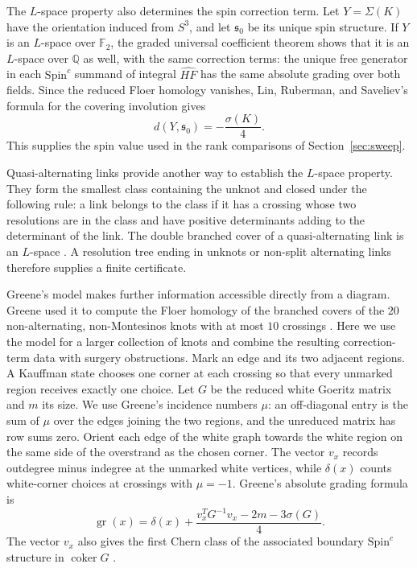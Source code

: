 \documentclass[12pt, oneside]{amsart}
\newcommand{\bbq}{{\mathbb Q}}
\newcommand{\dbc}{\Sigma}
\begin{document}
The $L$-space property also determines the spin correction term. Let
$Y=\dbc(K)$ have the orientation induced from $S^3$, and let $\mathfrak s_0$
be its unique spin structure. If $Y$ is an $L$-space over $\mathbb F_2$,
the graded universal coefficient theorem shows that it is an $L$-space over
$\bbq$ as well, with the same correction terms: the unique free generator
in each $\mathrm{Spin}^c$ summand of integral $\widehat{HF}$ has the same
absolute grading over both fields. Since the reduced Floer homology
vanishes, Lin, Ruberman, and Saveliev's formula for the covering involution
\cite[Thm.~A and Rem.~1.1]{LRS} gives
\begin{equation}\label{eq:lspace-spin}
    d(Y,\mathfrak s_0)=-\frac{\sigma(K)}4.
\end{equation}
This supplies the spin value used in the
rank comparisons of Section~\ref{sec:sweep}.

Quasi-alternating links provide another way to establish the $L$-space property. They
form the smallest class containing the unknot and closed under the following
rule: a link belongs to the class if it has a crossing whose two resolutions are
in the class and have positive determinants adding to the determinant of the
link. The double branched cover of a quasi-alternating link is an $L$-space
\cite[Def.~3.1 and Prop.~3.3]{OSbranched}. A resolution tree ending in unknots or
non-split alternating links therefore supplies a finite certificate.

Greene's model makes further information accessible directly from a diagram.
Greene used it to compute the Floer homology of the branched covers of the
$20$ non-alternating, non-Montesinos knots with at most $10$ crossings
\cite[\S7]{Greene}. Here we use the model for a larger collection of knots
and combine the resulting correction-term data with surgery obstructions.
Mark an edge and its two adjacent regions. A Kauffman state chooses
one corner at each crossing so that every unmarked region receives exactly one
choice. Let $G$ be the reduced white Goeritz matrix and $m$ its size. We use
Greene's incidence numbers $\mu$: an off-diagonal entry is the sum of $\mu$ over
the edges joining the two regions, and the unreduced matrix has row sums zero.
Orient each edge of the white graph towards the white region on the same side
of the overstrand as the chosen corner. The vector $v_x$ records outdegree minus
indegree at the unmarked white vertices, while $\delta(x)$ counts white-corner
choices at crossings with $\mu=-1$. Greene's absolute grading formula is
\cite[Thm.~4.1]{Greene}
\begin{equation}\label{eq:greene-grading}
    \operatorname{gr}(x)=\delta(x)
       +\frac{v_x^TG^{-1}v_x-2m-3\sigma(G)}{4}.
\end{equation}
The vector $v_x$ also gives the first Chern class of the associated boundary
$\mathrm{Spin}^c$ structure in $\operatorname{coker}G$
\cite[\S4.5]{Greene}.
\end{document}

